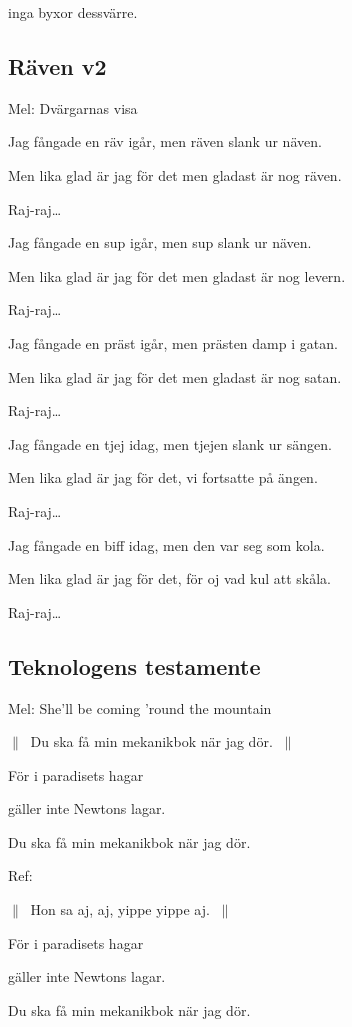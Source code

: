 inga byxor dessvärre.\bigskip

\subsection{\textbf{Räven v2}}

Mel: Dvärgarnas visa \bigskip

Jag fångade en räv igår, men räven slank ur näven.

Men lika glad är jag för det men gladast är nog räven.

Raj-raj…\bigskip

Jag fångade en sup igår, men sup slank ur näven.

Men lika glad är jag för det men gladast är nog levern.

Raj-raj…\bigskip

Jag fångade en präst igår, men prästen damp i gatan.

Men lika glad är jag för det men gladast är nog satan.

Raj-raj…\bigskip

Jag fångade en tjej idag, men tjejen slank ur sängen.

Men lika glad är jag för det, vi fortsatte på ängen.

Raj-raj…\bigskip

Jag fångade en biff idag, men den var seg som kola.

Men lika glad är jag för det, för oj vad kul att skåla.

Raj-raj…\bigskip

\subsection{\textbf{Teknologens testamente}}

Mel: She'll be coming 'round the mountain \bigskip


$\|\:$ Du ska få min mekanikbok när jag dör. $\:\|$

För i paradisets hagar

gäller inte Newtons lagar.

Du ska få min mekanikbok när jag dör.\bigskip

Ref:

$\|\:$ Hon sa aj, aj, yippe yippe aj. $\:\|$

För i paradisets hagar

gäller inte Newtons lagar.

Du ska få min mekanikbok när jag dör.\bigskip

